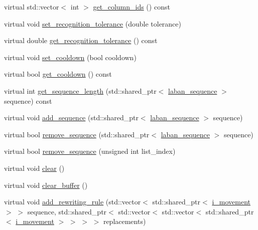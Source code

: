 \begin{DoxyCompactItemize}
\item 
virtual std\-::vector$<$ int $>$ \hyperlink{classmae_1_1fl_1_1laban_1_1decision__forest_a2083911f6ba13e21b5d47dce8f43af19}{get\-\_\-column\-\_\-ids} () const 
\item 
virtual void \hyperlink{classmae_1_1fl_1_1laban_1_1decision__forest_a7308f844dea15ccb31b7c85529388c04}{set\-\_\-recognition\-\_\-tolerance} (double tolerance)
\item 
virtual double \hyperlink{classmae_1_1fl_1_1laban_1_1decision__forest_afe7ba8da0927e0ea6bacf40355900976}{get\-\_\-recognition\-\_\-tolerance} () const 
\item 
virtual void \hyperlink{classmae_1_1fl_1_1laban_1_1decision__forest_a6402e3689c1af77d01e88dd08901abe2}{set\-\_\-cooldown} (bool cooldown)
\item 
virtual bool \hyperlink{classmae_1_1fl_1_1laban_1_1decision__forest_ada91da61e016fc7359bb18d6fa256bc7}{get\-\_\-cooldown} () const 
\item 
virtual int \hyperlink{classmae_1_1fl_1_1laban_1_1decision__forest_af445fa2708c0e256f6cc4c1209790011}{get\-\_\-sequence\-\_\-length} (std\-::shared\-\_\-ptr$<$ \hyperlink{classmae_1_1fl_1_1laban_1_1laban__sequence}{laban\-\_\-sequence} $>$ sequence) const 
\item 
virtual void \hyperlink{classmae_1_1fl_1_1laban_1_1decision__forest_a4794a8981cd0cfeb55a00ec6a5d01edf}{add\-\_\-sequence} (std\-::shared\-\_\-ptr$<$ \hyperlink{classmae_1_1fl_1_1laban_1_1laban__sequence}{laban\-\_\-sequence} $>$ sequence)
\item 
virtual bool \hyperlink{classmae_1_1fl_1_1laban_1_1decision__forest_a24a8f97645622dbd96543763821dc6e5}{remove\-\_\-sequence} (std\-::shared\-\_\-ptr$<$ \hyperlink{classmae_1_1fl_1_1laban_1_1laban__sequence}{laban\-\_\-sequence} $>$ sequence)
\item 
virtual bool \hyperlink{classmae_1_1fl_1_1laban_1_1decision__forest_a41951d257154b85832f3d6beea13d4e6}{remove\-\_\-sequence} (unsigned int list\-\_\-index)
\item 
virtual void \hyperlink{classmae_1_1fl_1_1laban_1_1decision__forest_aa623f14cda0e8d9566716be9bd6f74d4}{clear} ()
\item 
virtual void \hyperlink{classmae_1_1fl_1_1laban_1_1decision__forest_a27a03089c6b56f0735a872cae7c1eac0}{clear\-\_\-buffer} ()
\item 
virtual void \hyperlink{classmae_1_1fl_1_1laban_1_1decision__forest_a639c688ff26b2ecf20f30ae731d7f44f}{add\-\_\-rewriting\-\_\-rule} (std\-::vector$<$ std\-::shared\-\_\-ptr$<$ \hyperlink{classmae_1_1fl_1_1laban_1_1i__movement}{i\-\_\-movement} $>$ $>$ sequence, std\-::shared\-\_\-ptr$<$ std\-::vector$<$ std\-::vector$<$ std\-::shared\-\_\-ptr$<$ \hyperlink{classmae_1_1fl_1_1laban_1_1i__movement}{i\-\_\-movement} $>$ $>$ $>$ $>$ replacements)

\end{DoxyCompactItemize}
